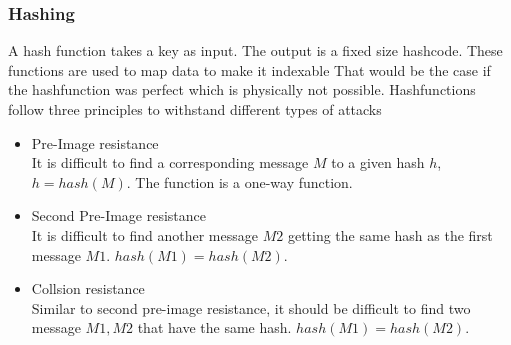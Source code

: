 \documentclass[journal]{IEEEtran}
\begin{document}
\subsubsection{Hashing}
    A hash function takes a key as input.
    The output is a fixed size hashcode.
    These functions are used to map data to make it indexable 
    That would be the case if the hashfunction was perfect which is physically not possible.
    Hashfunctions follow three principles to withstand different types of attacks
    \begin{itemize}[]
        \item Pre-Image resistance \\
        It is difficult to find a corresponding message $M$ to a given hash $h$, $h=hash(M)$.
        The function is a one-way function.
        \item Second Pre-Image resistance \\
        It is difficult to find another message $M2$ getting the same hash as the first message $M1$. $hash(M1)=hash(M2)$.
        \item Collsion resistance \\
        Similar to second pre-image resistance, it should be difficult to find two message $M1,M2$ that have the same hash. $hash(M1)=hash(M2)$.
    \end{itemize}
\end{document}
